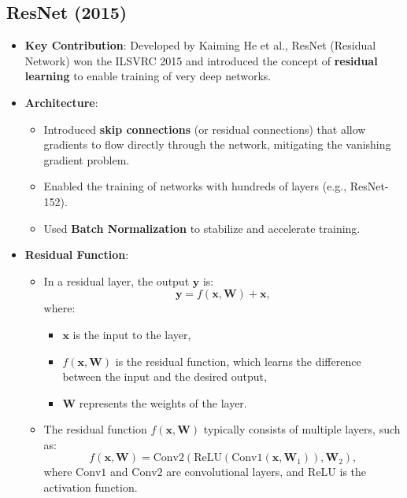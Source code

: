 \begin{notechapter}
\section{ResNet (2015)}
\begin{itemize}
  \item \textbf{Key Contribution}: Developed by Kaiming He et al., 
    ResNet (Residual Network) won the ILSVRC 2015 and introduced the 
    concept of \textbf{residual learning} to enable training of very 
    deep networks.
  \item \textbf{Architecture}:
    \begin{itemize}
      \item Introduced \textbf{skip connections} (or residual 
        connections) that allow gradients to flow directly through the 
        network, mitigating the vanishing gradient problem.
      \item Enabled the training of networks with hundreds of layers 
        (e.g., ResNet-152).
      \item Used \textbf{Batch Normalization} to stabilize and 
        accelerate training.
    \end{itemize}
  \item \textbf{Residual Function}:
    \begin{itemize}
      \item In a residual layer, the output \( \mathbf{y} \) is:
        \[
        \mathbf{y} = f(\mathbf{x}, \mathbf{W}) + \mathbf{x},
        \]
        where:
        \begin{itemize}
          \item \( \mathbf{x} \) is the input to the layer,
          \item \( f(\mathbf{x}, \mathbf{W}) \) is the residual 
            function, which learns the difference between the input and 
            the desired output,
          \item \( \mathbf{W} \) represents the weights of the layer.
        \end{itemize}
      \item The residual function \( f(\mathbf{x}, \mathbf{W}) \) 
        typically consists of multiple layers, such as:
        \[
        f(\mathbf{x}, \mathbf{W}) = \text{Conv2}(\text{ReLU}(
        \text{Conv1}(\mathbf{x}, \mathbf{W}_1)), \mathbf{W}_2),
        \]
        where \( \text{Conv1} \) and \( \text{Conv2} \) are 
        convolutional layers, and \( \text{ReLU} \) is the activation 
        function.
    \end{itemize}

\end{itemize}
\end{notechapter}
